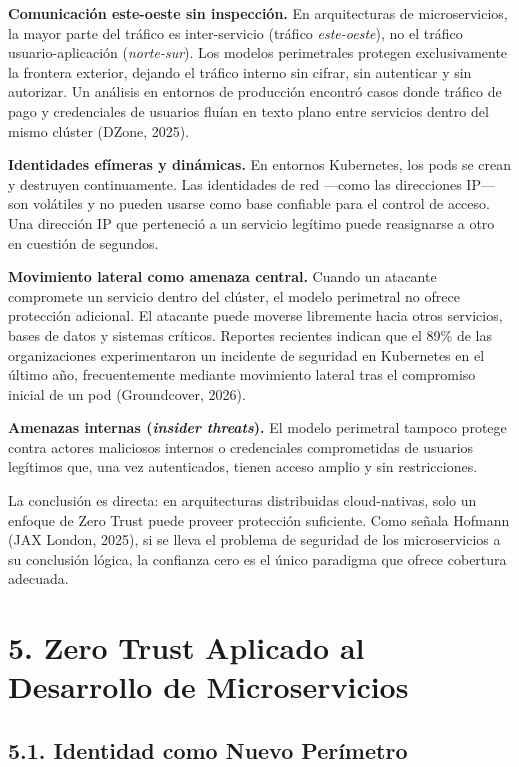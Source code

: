 \documentclass[12pt,a4paper]{article}
\begin{document}
\textbf{Comunicación este-oeste sin inspección.} En arquitecturas de microservicios, la mayor parte del tráfico es inter-servicio (tráfico \textit{este-oeste}), no el tráfico usuario-aplicación (\textit{norte-sur}). Los modelos perimetrales protegen exclusivamente la frontera exterior, dejando el tráfico interno sin cifrar, sin autenticar y sin autorizar. Un análisis en entornos de producción encontró casos donde tráfico de pago y credenciales de usuarios fluían en texto plano entre servicios dentro del mismo clúster (DZone, 2025).

\textbf{Identidades efímeras y dinámicas.} En entornos Kubernetes, los pods se crean y destruyen continuamente. Las identidades de red —como las direcciones IP— son volátiles y no pueden usarse como base confiable para el control de acceso. Una dirección IP que perteneció a un servicio legítimo puede reasignarse a otro en cuestión de segundos.

\textbf{Movimiento lateral como amenaza central.} Cuando un atacante compromete un servicio dentro del clúster, el modelo perimetral no ofrece protección adicional. El atacante puede moverse libremente hacia otros servicios, bases de datos y sistemas críticos. Reportes recientes indican que el 89\% de las organizaciones experimentaron un incidente de seguridad en Kubernetes en el último año, frecuentemente mediante movimiento lateral tras el compromiso inicial de un pod (Groundcover, 2026).

\textbf{Amenazas internas (\textit{insider threats}).} El modelo perimetral tampoco protege contra actores maliciosos internos o credenciales comprometidas de usuarios legítimos que, una vez autenticados, tienen acceso amplio y sin restricciones.

La conclusión es directa: en arquitecturas distribuidas cloud-nativas, solo un enfoque de Zero Trust puede proveer protección suficiente. Como señala Hofmann (JAX London, 2025), si se lleva el problema de seguridad de los microservicios a su conclusión lógica, la confianza cero es el único paradigma que ofrece cobertura adecuada.



\section{5. Zero Trust Aplicado al Desarrollo de Microservicios}

\subsection{5.1. Identidad como Nuevo Perímetro}
\end{document}
